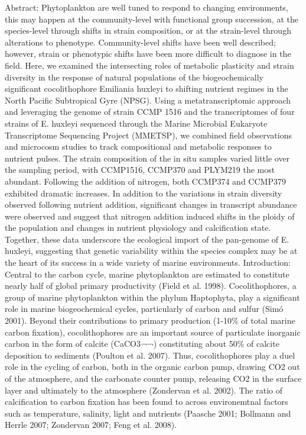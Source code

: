 Abstract: 
Phytoplankton are well tuned to respond to changing environments, this may happen at the community-level with functional group succession, at the species-level through shifts in strain composition, or at the strain-level through alterations to phenotype. Community-level shifts have been well described; however, strain or phenotypic shifts have been more difficult to diagnose in the field. Here, we examined the intersecting roles of metabolic plasticity and strain diversity in the response of natural populations of the biogeochemically significant cocolithophore Emiliania huxleyi to shifting nutrient regimes in the North Pacific Subtropical Gyre (NPSG). Using a metatranscriptomic approach and leveraging the genome of strain CCMP 1516 and the transcriptomes of four strains of E. huxleyi sequenced through the Marine Microbial Eukaryote Transcriptome Sequencing Project (MMETSP), we combined field observations and microcosm studies to track compositional and metabolic responses to nutrient pulses. The strain composition of the in situ samples varied little over the sampling period, with CCMP1516, CCMP370 and PLYM219 the most abundant.  Following the addition of nitrogen, both CCMP374 and CCMP379 exhibited dramatic increases. In addition to the variations in strain diversity observed following nutrient addition, significant changes in transcript abundance were observed and suggest that nitrogen addition induced shifts in the ploidy of the population and changes in nutrient physiology and calcification state. Together, these data underscore the ecological import of the pan-genome of E. huxleyi, suggesting that genetic variability within the species complex may be at the heart of its success in a wide variety of marine environments. 
Introduction:
Central to the carbon cycle, marine phytoplankton are estimated to constitute nearly half of global primary productivity (Field et al. 1998). Cocolithophores, a group of marine phytoplankton within the phylum Haptophyta, play a significant role in marine biogeochemical cycles, particularly of carbon and sulfur (Simó 2001). Beyond their contributions to primary production (1-10\% of total marine carbon fixation), cocolithophores are an important source of particulate inorganic carbon in the form of calcite (CaCO3¬¬) constituting about 50\% of calcite deposition to sediments (Poulton et al. 2007). Thus, cocolithophores play a duel role in the cycling of carbon, both in the organic carbon pump, drawing CO2 out of the atmosphere, and the carbonate counter pump, releasing CO2 in the surface layer and ultimately to the atmosphere (Zondervan et al. 2002). The ratio of calcification to carbon fixation has been found to across environemtnal factors such as temperature, salinity, light and nutrients (Paasche 2001; Bollmann and Herrle 2007; Zondervan 2007; Feng et al. 2008). 
